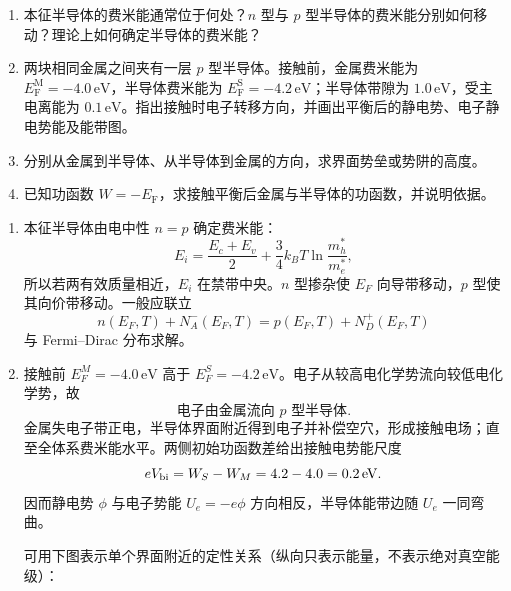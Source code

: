 \begin{question}[20 分]
\begin{enumerate}
  \item 本征半导体的费米能通常位于何处？$n$ 型与 $p$ 型半导体的费米能分别如何移动？理论上如何确定半导体的费米能？
  \item 两块相同金属之间夹有一层 $p$ 型半导体。接触前，金属费米能为 $E_{\mathrm F}^{\mathrm M}=-4.0\,\mathrm{eV}$，半导体费米能为 $E_{\mathrm F}^{\mathrm S}=-4.2\,\mathrm{eV}$；半导体带隙为 $1.0\,\mathrm{eV}$，受主电离能为 $0.1\,\mathrm{eV}$。指出接触时电子转移方向，并画出平衡后的静电势、电子静电势能及能带图。
  \item 分别从金属到半导体、从半导体到金属的方向，求界面势垒或势阱的高度。
  \item 已知功函数 $W=-E_{\mathrm F}$，求接触平衡后金属与半导体的功函数，并说明依据。
\end{enumerate}


\begin{solution}
\begin{enumerate}
  \item 本征半导体由电中性 $n=p$ 确定费米能：
  \[
    E_i=\frac{E_c+E_v}{2}
    +\frac34k_BT\ln\frac{m_h^*}{m_e^*},
  \]
  所以若两有效质量相近，$E_i$ 在禁带中央。$n$ 型掺杂使 $E_F$ 向导带移动，$p$ 型使其向价带移动。一般应联立
  \[
    n(E_F,T)+N_A^-(E_F,T)=p(E_F,T)+N_D^+(E_F,T)
  \]
  与 Fermi--Dirac 分布求解。

  \item 接触前 $E_F^M=-4.0\,\mathrm{eV}$ 高于
  $E_F^S=-4.2\,\mathrm{eV}$。电子从较高电化学势流向较低电化学势，故
  \[
    \boxed{\text{电子由金属流向 }p\text{ 型半导体}.}
  \]
  金属失电子带正电，半导体界面附近得到电子并补偿空穴，形成接触电场；直至全体系费米能水平。两侧初始功函数差给出接触电势能尺度
  \[
    eV_{\rm bi}=W_S-W_M=4.2-4.0=0.2\,\mathrm{eV}.
  \]
  因而静电势 $\phi$ 与电子势能 $U_e=-e\phi$ 方向相反，半导体能带边随 $U_e$ 一同弯曲。

  可用下图表示单个界面附近的定性关系（纵向只表示能量，不表示绝对真空能级）：
  \begin{center}
\end{center}
\end{enumerate}
\end{solution}
\end{question}

